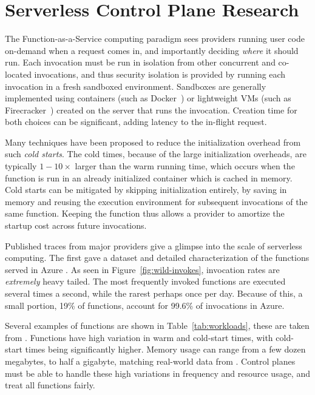 \section{Serverless Control Plane Research}
\label{sec:platform-enhance}

The Function-as-a-Service computing paradigm sees providers running user code on-demand when a request comes in, and importantly deciding \emph{where} it should run. 
Each invocation must be run in isolation from other concurrent and co-located invocations, and thus security isolation is provided by running each invocation in a fresh sandboxed environment. 
Sandboxes are generally implemented using containers (such as Docker~\cite{docker-main}) or lightweight VMs (such as Firecracker~\cite{firecracker-nsdi20}) created on the server that runs the invocation.
Creation time for both choices can be significant, adding latency to the in-flight request. 

Many techniques have been proposed to reduce the initialization overhead from such \emph{cold starts}.
The cold times, because of the large initialization overheads, are typically $1-10\times$ larger than the warm running time, which occurs when the function is run in an already initialized container which is cached in memory. 
Cold starts can be mitigated by skipping initialization entirely, by saving in memory and reusing the execution environment for subsequent invocations of the same function. 
Keeping the function  thus allows a provider to amortize the startup cost across future invocations. 

Published traces from major providers give a glimpse into the scale of serverless computing.
The first gave a dataset and detailed characterization of the functions served in Azure \cite{shahrad_serverless_2020}.
As seen in Figure~\ref{fig:wild-invokes}, invocation rates are \emph{extremely} heavy tailed.
The most frequently invoked functions are executed several times a second, while the rarest perhaps once per day.
Because of this, a small portion, 19\% of functions, account for 99.6\% of invocations in Azure.

Several examples of functions are shown in Table~\ref*{tab:workloads}, these are taken from \cite{functionbench}.
Functions have high variation in warm and cold-start times, with cold-start times being significantly higher.
Memory usage can range from a few dozen megabytes, to half a gigabyte, matching real-world data from \cite{shahrad_serverless_2020}.
Control planes must be able to handle these high variations in frequency and resource usage, and treat all functions fairly.

